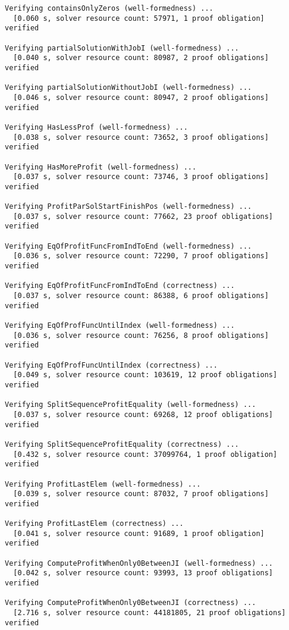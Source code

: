 \begin{Verbatim}[fontsize=\footnotesize]
Verifying containsOnlyZeros (well-formedness) ...
  [0.060 s, solver resource count: 57971, 1 proof obligation]  verified

Verifying partialSolutionWithJobI (well-formedness) ...
  [0.040 s, solver resource count: 80987, 2 proof obligations]  verified

Verifying partialSolutionWithoutJobI (well-formedness) ...
  [0.046 s, solver resource count: 80947, 2 proof obligations]  verified

Verifying HasLessProf (well-formedness) ...
  [0.038 s, solver resource count: 73652, 3 proof obligations]  verified

Verifying HasMoreProfit (well-formedness) ...
  [0.037 s, solver resource count: 73746, 3 proof obligations]  verified

Verifying ProfitParSolStartFinishPos (well-formedness) ...
  [0.037 s, solver resource count: 77662, 23 proof obligations]  verified

Verifying EqOfProfitFuncFromIndToEnd (well-formedness) ...
  [0.036 s, solver resource count: 72290, 7 proof obligations]  verified

Verifying EqOfProfitFuncFromIndToEnd (correctness) ...
  [0.037 s, solver resource count: 86388, 6 proof obligations]  verified

Verifying EqOfProfFuncUntilIndex (well-formedness) ...
  [0.036 s, solver resource count: 76256, 8 proof obligations]  verified

Verifying EqOfProfFuncUntilIndex (correctness) ...
  [0.049 s, solver resource count: 103619, 12 proof obligations]  verified

Verifying SplitSequenceProfitEquality (well-formedness) ...
  [0.037 s, solver resource count: 69268, 12 proof obligations]  verified

Verifying SplitSequenceProfitEquality (correctness) ...
  [0.432 s, solver resource count: 37099764, 1 proof obligation]  verified

Verifying ProfitLastElem (well-formedness) ...
  [0.039 s, solver resource count: 87032, 7 proof obligations]  verified

Verifying ProfitLastElem (correctness) ...
  [0.041 s, solver resource count: 91689, 1 proof obligation]  verified

Verifying ComputeProfitWhenOnly0BetweenJI (well-formedness) ...
  [0.042 s, solver resource count: 93993, 13 proof obligations]  verified

Verifying ComputeProfitWhenOnly0BetweenJI (correctness) ...
  [2.716 s, solver resource count: 44181805, 21 proof obligations]  verified


\end{Verbatim}
